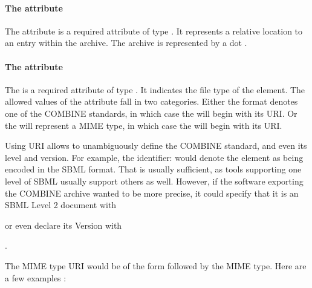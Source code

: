\paragraph{The  attribute}
The  attribute is a required attribute of type 
. It represents a relative location to an entry within the 
archive. The archive is represented by a dot . 

\paragraph{The  attribute}
The  is a required attribute of type . It 
indicates the file type of the \Content element. The allowed values of the 
 attribute fall in two categories. Either the format 
denotes one of the COMBINE standards, in which case the  
will begin with its  URI. Or the 
 will represent a MIME type, in which case the  
will begin with its  URI. 

Using  URI allows to unambiguously define the COMBINE standard, and even its level and version. For example, the identifier:  would denote the \Content 
element as being encoded in the SBML format. That is usually sufficient, as tools supporting one level of SBML usually
support others as well. However, if the software exporting the COMBINE archive wanted to be more precise, it could specify that it is an SBML Level 2 document with 

\begin{center}
\end{center}

or even declare its Version with 

\begin{center}
.
\end{center}

The MIME type  URI would be of the form 
followed by the MIME type. Here are a few examples :

\begin{center}
\\
\\
\\
\end{center}

